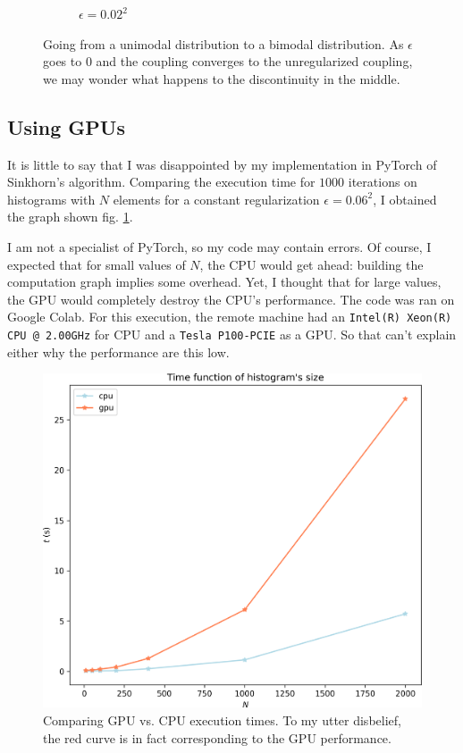\begin{figure}[h]
\begin{subfigure}[b]{0.49\textwidth}
         \caption{$\epsilon = 0.02^2$}
     \end{subfigure}
    \caption{Going from a unimodal distribution to a bimodal distribution. As $\epsilon$ goes to $0$ and the coupling converges to the unregularized coupling, we may wonder what happens to the discontinuity in the middle.}
\end{figure}

\subsection{Using GPUs}

It is little to say that I was disappointed by my implementation in PyTorch of Sinkhorn's algorithm. Comparing the execution time for $1000$ iterations on histograms with $N$ elements for a constant regularization $\epsilon = 0.06^2$, I obtained the graph shown fig. \ref{fig:gpu_vs_cpu}.

I am not a specialist of PyTorch, so my code may contain errors. Of course, I expected that for small values of $N$, the CPU would get ahead: building the computation graph implies some overhead. Yet, I thought that for large values, the GPU would completely destroy the CPU's performance. The code was ran on Google Colab. For this execution, the remote machine had an \texttt{Intel(R) Xeon(R) CPU @ 2.00GHz} for CPU and a \texttt{Tesla P100-PCIE} as a GPU. So that can't explain either why the performance are this low. 

\begin{figure}[p]
    \centering
    \includegraphics[width=.7\textwidth]{samples/2/gpu_vs_cpu.png}
    \caption{Comparing GPU vs. CPU execution times. To my utter disbelief, the red curve is in fact corresponding to the GPU performance.}
    \label{fig:gpu_vs_cpu}
\end{figure}

